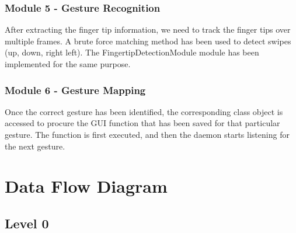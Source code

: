 \documentclass[11pt]{report}
\begin{document}
\subsection{Module 5 - Gesture Recognition}
After extracting the finger tip information, we need to track the finger tips over multiple frames. 
A brute force matching method has been used to detect swipes (up, down, right left). The FingertipDetectionModule
module has been implemented for the same purpose.

\subsection{Module 6 - Gesture Mapping}

Once the correct gesture has been identified, 
the corresponding class object is accessed to procure the GUI function that has been saved 
for that particular gesture. The function is first executed, and then the daemon starts listening 
for the next gesture.

\chapter{Data Flow Diagram}

\section{Level 0}
\\
\end{document}
